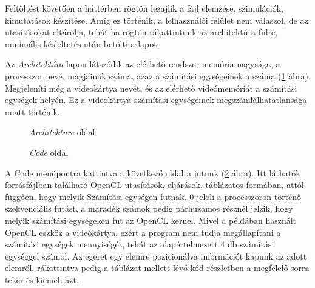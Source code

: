 Feltöltést követően a háttérben rögtön lezajlik a fájl elemzése, szimulációk, kimutatások készítése. Amíg ez történik, a felhasználói felület nem válaszol, de az utasításokat eltárolja, tehát ha rögtön rákattintunk az architektúra fülre, minimális késleltetés után betölti a lapot.



\newpage
Az \textit{Architektúra} lapon látszódik az elérhető rendszer memória nagysága, a processzor neve, magjainak száma, azaz a számítási egységeinek a száma (\ref{fig:arch} ábra). Megjeleníti még a videokártya nevét, és az elérhető videómemóriát a számítási egységek helyén. Ez a videokártya számítási egységeinek megszámlálhatatlansága miatt történik.


\begin{figure}[h!]
\centering
{}
\caption{\textit{Architekture} oldal}
\label{fig:arch}
\end{figure}

\begin{figure}[h!]
\centering
{}
\caption{\textit{Code} oldal}
\label{fig:code}
\end{figure}


A Code menüpontra kattintva a következő oldalra jutunk (\ref{fig:code} ábra). Itt láthatók forrásfájlban található OpenCL utasítások, eljárások, táblázatos formában, attól függően, hogy melyik Számítási egységen futnak. 0 jelöli a processzoron történő szekvenciális futást, a maradék számok pedig párhuzamos résznél jelzik, hogy melyik számítási egységeken fut az OpenCL kernel. Mivel a példában használt OpenCL eszköz a videókártya, ezért a program nem tudja megállapítani a számítási egységek mennyiségét, tehát az alapértelmezett 4 db számítási egységgel számol. Az egeret egy elemre pozicionálva információt kapunk az adott elemről, rákattintva pedig a táblázat mellett lévő kód részletben a megfelelő sorra teker és kiemeli azt.

